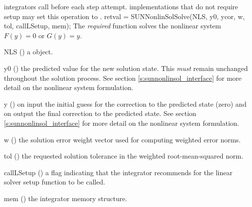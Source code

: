 {
  {\sundials} integrators call  before each step
  attempt. {\sunnonlinsol} implementations that do not require setup  may set
  this operation to .
}
{
  retval = SUNNonlinSolSolve(NLS, y0, ycor, w, tol, callLSetup, mem);
}
{
  The \textit{required} function  solves the
  nonlinear system $F(y)=0$ or $G(y)=y$.
}
{
  \begin{args}[callLSetup]
  \item[NLS] ()
    a {\sunnonlinsol} object.
  \item[y0] ()
    the predicted value for the new solution state. This \textit{must}
    remain unchanged throughout the solution process. See section
    \ref{s:sunnonlinsol_interface} for more detail on the nonlinear system
    formulation.
  \item[y] ()
    on input the initial guess for the correction to the predicted state (zero)
    and on output the final correction to the predicted state. See section
    \ref{s:sunnonlinsol_interface} for more detail on the nonlinear system
    formulation.
  \item[w] ()
    the solution error weight vector used for computing weighted error norms.
  \item[tol] ()
    the requested solution tolerance in the weighted root-mean-squared norm.
  \item[callLSetup] ()
    a flag indicating that the integrator recommends for the linear
    solver setup function to be called.
  \item[mem] ()
    the {\sundials} integrator memory structure.
  \end{args}
}
